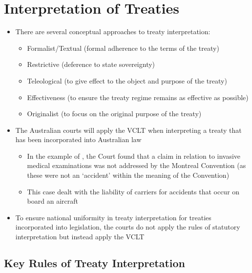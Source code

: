 \section{Interpretation of Treaties}\label{sec:Interpretation of Treaties}
\begin{itemize}
    \item There are several conceptual approaches to treaty interpretation:
    \begin{itemize}
        \item Formalist/Textual (formal adherence to the terms of the treaty)
        \item Restrictive (deference to state sovereignty)
        \item Teleological (to give effect to the object and purpose of the treaty)
        \item Effectiveness (to ensure the treaty regime remains as effective as possible)
        \item Originalist (to focus on the original purpose of the treaty)
    \end{itemize}
    \item The Australian courts will apply the VCLT when interpreting a treaty that has been incorporated into Australian law
    \begin{itemize}
        \item In the example of , the Court found that a claim in relation to invasive medical examinations was not addressed by the Montreal Convention (as these were not an `accident' within the meaning of the Convention)
        \item This case dealt with the liability of carriers for accidents that occur on board an aircraft
    \end{itemize}
    \item To ensure national uniformity in treaty interpretation for treaties incorporated into legislation, the courts do not apply the rules of statutory interpretation but instead apply the VCLT
\end{itemize}

\subsection{Key Rules of Treaty Interpretation}

